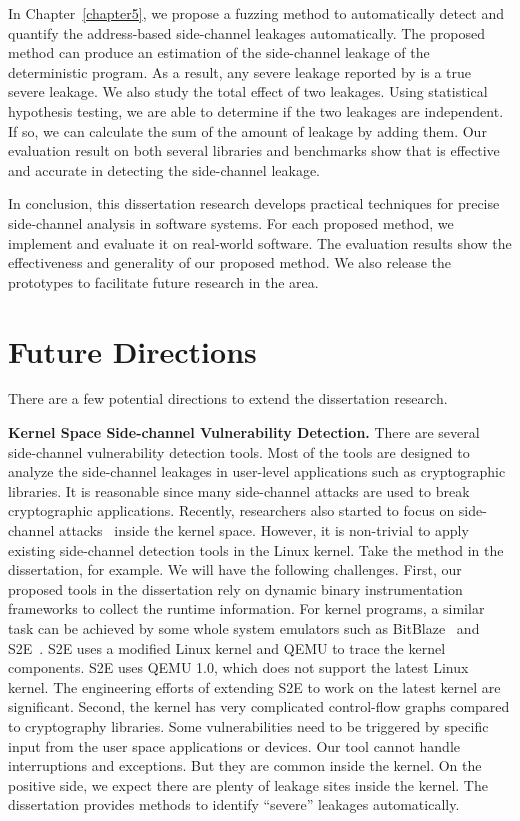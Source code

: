 In Chapter~\ref{chapter5}, we propose a fuzzing method to automatically detect and quantify the address-based side-channel leakages automatically. The proposed method can produce an estimation of the side-channel leakage of the deterministic program. As a result, any severe leakage reported by \ctool{} is a true severe leakage. We also study the total effect of two leakages. Using statistical hypothesis testing, we are able to determine if the two leakages are independent. If so, we can calculate the sum of the amount of leakage by adding them. Our evaluation result on both several libraries and benchmarks show that \ctool{} is effective and accurate in detecting the side-channel leakage.

In conclusion, this dissertation research develops practical techniques for precise side-channel analysis in software systems. For each proposed method, we implement and evaluate it on real-world software. The evaluation results show the effectiveness and generality of our proposed method.  We also release the prototypes to facilitate future research in the area.
\section{Future Directions}
There are a few potential directions to extend the dissertation research. 

\textbf{Kernel Space Side-channel Vulnerability Detection.} There are several side-channel vulnerability detection tools. Most of the tools are designed to analyze the side-channel leakages in user-level applications such as cryptographic libraries. It is reasonable since many side-channel attacks are used to break cryptographic applications. Recently, researchers also started to focus on side-channel attacks~\cite{cao2016off} inside the kernel space. However, it is non-trivial to apply existing side-channel detection tools in the Linux kernel. Take the method in the dissertation, for example. We will have the following challenges. First, our proposed tools in the dissertation rely on dynamic binary instrumentation frameworks to collect the runtime information. For kernel programs, a similar task can be achieved by some whole system emulators such as BitBlaze~\cite{song2008bitblaze} and S2E~\cite{chipounov2012s2e}. S2E uses a modified Linux kernel and QEMU to trace the kernel components. S2E uses QEMU 1.0, which does not support the latest Linux kernel. The engineering efforts of extending S2E to work on the latest kernel are significant. Second, the kernel has very complicated control-flow graphs compared to cryptography libraries. Some vulnerabilities need to be triggered by specific input from the user space applications or devices. Our tool cannot handle interruptions and exceptions. But they are common inside the kernel. On the positive side, we expect there are plenty of leakage sites inside the kernel. The dissertation provides methods to identify ``severe'' leakages automatically.


